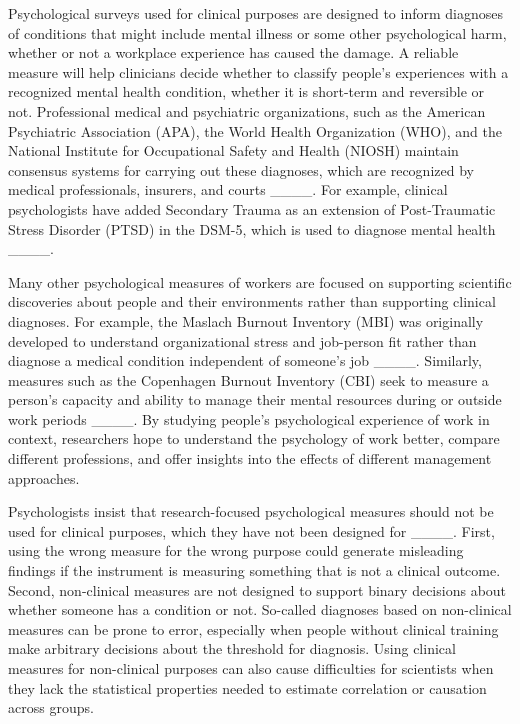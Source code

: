 Psychological surveys used for clinical purposes are designed to inform diagnoses of conditions that might include mental illness or some other psychological harm, whether or not a workplace experience has caused the damage. A reliable measure will help clinicians decide whether to classify people's experiences with a recognized mental health condition, whether it is short-term and reversible or not. Professional medical and psychiatric organizations, such as the American Psychiatric Association (APA), the World Health Organization (WHO), and the National Institute for Occupational Safety and Health (NIOSH) maintain consensus systems for carrying out these diagnoses, which are recognized by medical professionals, insurers, and courts ____. For example, clinical psychologists have added Secondary Trauma as an extension of Post-Traumatic Stress Disorder (PTSD) in the DSM-5, which is used to diagnose mental health ____.

Many other psychological measures of workers are focused on supporting scientific discoveries about people and their environments rather than supporting clinical diagnoses. For example, the Maslach Burnout Inventory (MBI) was originally developed to understand organizational stress and job-person fit rather than diagnose a medical condition independent of someone's job ____. Similarly, measures such as the Copenhagen Burnout Inventory (CBI) seek to measure a person's capacity and ability to manage their mental resources during or outside work periods ____. By studying people's psychological experience of work in context, researchers hope to understand the psychology of work better, compare different professions, and offer insights into the effects of different management approaches.

Psychologists insist that research-focused psychological measures should not be used for clinical purposes, which they have not been designed for ____. First, using the wrong measure for the wrong purpose could generate misleading findings if the instrument is measuring something that is not a clinical outcome. Second, non-clinical measures are not designed to support binary decisions about whether someone has a condition or not. So-called diagnoses based on non-clinical measures can be prone to error, especially when people without clinical training make arbitrary decisions about the threshold for diagnosis. Using clinical measures for non-clinical purposes can also cause difficulties for scientists when they lack the statistical properties needed to estimate correlation or causation across groups.

